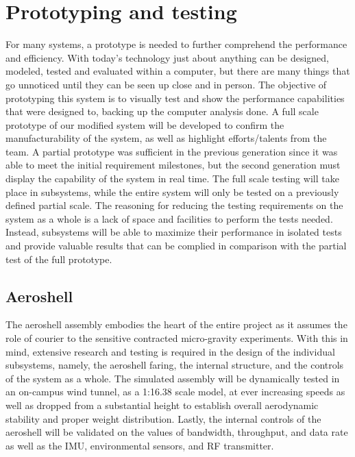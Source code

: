 \section{Prototyping and testing}

\indent\indent For many systems, a prototype is needed to further comprehend the performance and efficiency. With today's technology just about anything can be designed, modeled, tested and evaluated within a computer, but there are many things that go unnoticed until they can be seen up close and in person. The objective of prototyping this system is to visually test and show the performance capabilities that were designed to, backing up the computer analysis done. A full scale prototype of our modified system will be developed to confirm the manufacturability of the system, as well as highlight efforts/talents from the team. A partial prototype was sufficient in the previous generation since it was able to meet the initial requirement milestones, but the second generation must display the capability of the system in real time. The full scale testing will take place in subsystems, while the entire system will only be tested on a previously defined partial scale. The reasoning for reducing the testing requirements on the system as a whole is a lack of space and facilities to perform the tests needed. Instead, subsystems will be able to maximize their performance in isolated tests and provide valuable results that can be complied in comparison with the partial test of the full prototype. 


\subsection{Aeroshell}

\indent\indent The aeroshell assembly embodies the heart of the entire project as it assumes the role of courier to the sensitive contracted micro-gravity experiments. With this in mind, extensive research and testing is required in the design of the individual subsystems, namely, the aeroshell faring, the internal structure, and the controls of the system as a whole. The simulated assembly will be dynamically tested in an on-campus wind tunnel, as a 1:16.38 scale model, at ever increasing speeds as well as dropped from a substantial height to establish overall aerodynamic stability and proper weight distribution. Lastly, the internal controls of the aeroshell will be validated on the values of bandwidth, throughput, and data rate as well as the IMU, environmental sensors, and RF transmitter. 

